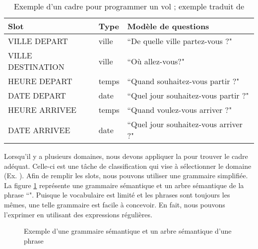 \documentclass{KodeBook}
\begin{document}

\begin{table}[ht]
	\centering
	\begin{tabular}{lll}
		\hline\hline
		Slot & Type & Modèle de questions \\
		\hline
		VILLE DEPART & ville & ``De quelle ville partez-vous ?" \\
		VILLE DESTINATION & ville & ``Où allez-vous?" \\
		HEURE DEPART & temps & ``Quand souhaitez-vous partir ?" \\
		DATE DEPART & date & ``Quel jour souhaitez-vous partir ?" \\
		HEURE ARRIVEE & temps & ``Quand voulez-vous arriver ?" \\
		DATE ARRIVEE & date & ``Quel jour souhaitez-vous arriver ?" \\
		\hline\hline
	\end{tabular}
	\caption[Exemple d'un cadre pour programmer un vol.]{Exemple d'un cadre pour programmer un vol ; exemple traduit de \cite{2020-jurafsky-martin}}
	\label{tab:sd-tache-frame-exp}
\end{table}

Lorsqu'il y a plusieurs domaines, nous devons appliquer la  pour trouver le cadre adéquat.
Celle-ci est une tâche de classification qui vise à sélectionner le domaine (Ex. ).
Afin de remplir les slots, nous pouvons utiliser une grammaire simplifiée. 
La figure \ref{fig:sd-tache-frame-parse} représente une grammaire sémantique et un arbre sémantique de la phrase ``".
Puisque le vocabulaire est limité et les phrases sont toujours les mêmes, une telle grammaire est facile à concevoir. 
En fait, nous pouvons l'exprimer en utilisant des expressions régulières.

\begin{figure}[!ht]
	\centering
	
	\caption[Exemple d'une grammaire sémantique et un arbre sémantique d'une phrase]{Exemple d'une grammaire sémantique et un arbre sémantique d'une phrase \cite{2020-jurafsky-martin}}
	\label{fig:sd-tache-frame-parse}
\end{figure}
\end{document}
